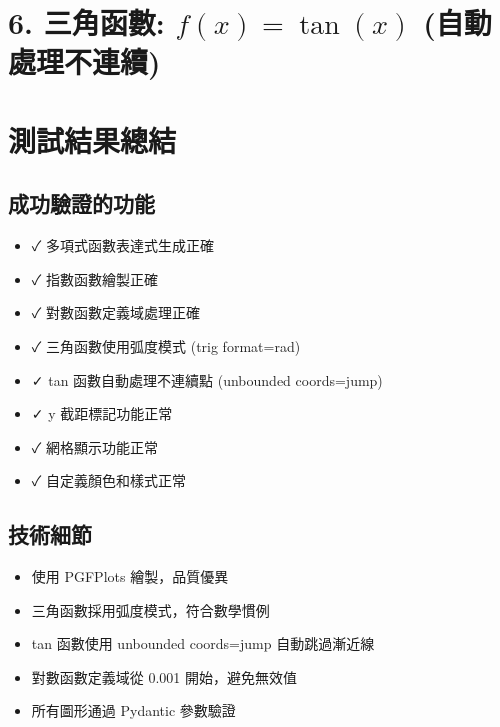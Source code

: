\documentclass{article}
\begin{document}
\vspace{1cm}

\section*{6. 三角函數: $f(x) = \tan(x)$ (自動處理不連續)}

\begin{center}
\end{center}

\newpage
\section*{測試結果總結}

\subsection*{成功驗證的功能}
\begin{itemize}
  \item ✓ 多項式函數表達式生成正確
  \item ✓ 指數函數繪製正確
  \item ✓ 對數函數定義域處理正確
  \item ✓ 三角函數使用弧度模式 (trig format=rad)
  \item ✓ tan 函數自動處理不連續點 (unbounded coords=jump)
  \item ✓ y 截距標記功能正常
  \item ✓ 網格顯示功能正常
  \item ✓ 自定義顏色和樣式正常
\end{itemize}

\subsection*{技術細節}
\begin{itemize}
  \item 使用 PGFPlots 繪製，品質優異
  \item 三角函數採用弧度模式，符合數學慣例
  \item tan 函數使用 unbounded coords=jump 自動跳過漸近線
  \item 對數函數定義域從 0.001 開始，避免無效值
  \item 所有圖形通過 Pydantic 參數驗證
\end{itemize}
\end{document}
